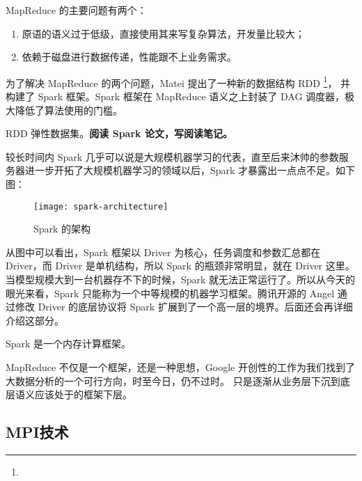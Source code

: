 MapReduce 的主要问题有两个：
\begin{enumerate}
  \item 原语的语义过于低级，直接使用其来写复杂算法，开发量比较大；
  \item 依赖于磁盘进行数据传递，性能跟不上业务需求。
\end{enumerate}

为了解决 MapReduce 的两个问题，Matei 提出了一种新的数据结构 RDD%
\footnote{}，
并构建了 Spark 框架。Spark 框架在 MapReduce 语义之上封装了 DAG 调度器，极大降低了算法使用的门槛。

\begin{newnote}[RDD]
RDD 弹性数据集。\textbf{阅读 Spark 论文，写阅读笔记。}  %
\end{newnote}

较长时间内 Spark 几乎可以说是大规模机器学习的代表，直至后来沐帅的参数服务器进一步开拓了大规模机器学习的领域以后，Spark 才暴露出一点点不足。如下图：

\begin{figure}[hbtp]
\centering
\texttt{[image: spark-architecture]}
\caption{Spark 的架构}
\end{figure}

从图中可以看出，Spark 框架以 Driver 为核心，任务调度和参数汇总都在 Driver，而 Driver 是单机结构，所以 Spark 的瓶颈非常明显，就在 Driver 这里。
当模型规模大到一台机器存不下的时候，Spark 就无法正常运行了。所以从今天的眼光来看，Spark 只能称为一个中等规模的机器学习框架。腾讯开源的 Angel 通过修改 Driver 的底层协议将 Spark 扩展到了一个高一层的境界。后面还会再详细介绍这部分。

\begin{newnote}[Spark]
Spark 是一个内存计算框架。
\end{newnote}

MapReduce 不仅是一个框架，还是一种思想，Google 开创性的工作为我们找到了大数据分析的一个可行方向，时至今日，仍不过时。
只是逐渐从业务层下沉到底层语义应该处于的框架下层。


\subsection{MPI技术}\label{subsec:mpi}

